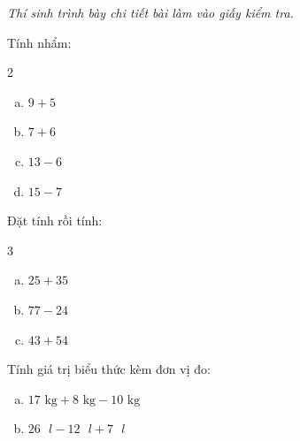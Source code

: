 {\itshape Thí sinh trình bày chi tiết bài làm vào giấy kiểm tra.}

\begin{bt}[1,0 điểm]
Tính nhẩm:
\begin{multicols}{2}
\begin{enumerate}[a)]
  \item $9 + 5$
  \item $7 + 6$
  \item $13 - 6$
  \item $15 - 7$
\end{enumerate}
\end{multicols}
\end{bt}

\begin{bt}[1,5 điểm]
Đặt tính rồi tính:
\begin{multicols}{3}
\begin{enumerate}[a)]
  \item $25 + 35$
  \item $77 - 24$
  \item $43 + 54$
\end{enumerate}
\end{multicols}
\end{bt}

\begin{bt}[1,0 điểm]
Tính giá trị biểu thức kèm đơn vị đo:
\begin{enumerate}[a)]
  \item $17\text{ kg} + 8\text{ kg} - 10\text{ kg}$
  \item $26\text{ }l - 12\text{ }l + 7\text{ }l$
\end{enumerate}
\end{bt}


